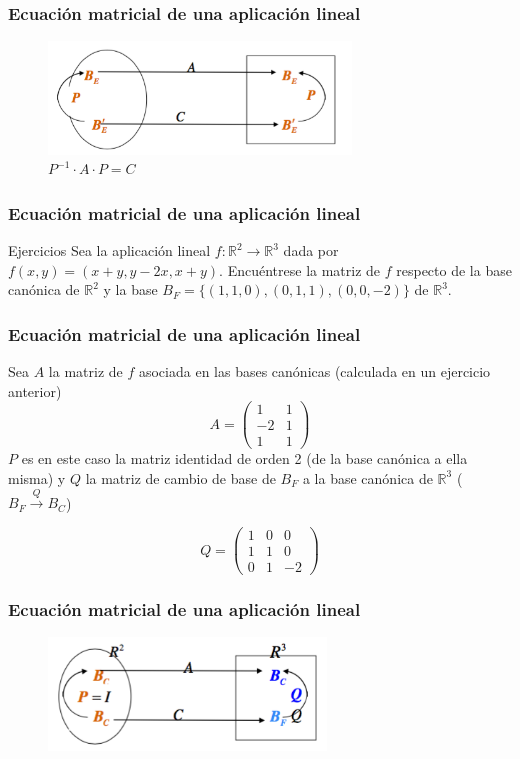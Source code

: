 \documentclass{beamer}
\begin{document}
 \begin{frame}
\frametitle{Ecuaci\'on matricial de una aplicaci\'on lineal}
\begin{figure}[h]
\label{fig:matriz de cambio}
\caption{$P^{-1}\cdot A \cdot P = C$}
\centering
\includegraphics[height=3cm]{canvi_2}
\end{figure}
 \end{frame}   
 
 
          \begin{frame}
  \frametitle{Ecuaci\'on matricial de una aplicaci\'on lineal}
\begin{block}{Ejercicios}
Sea la aplicaci\'on lineal $f:\mathbb R^2 \longrightarrow \mathbb R^3$ dada por $f(x,y)= (x+y, y-2x, x+y)$. Encu\'entrese la matriz de $f$ respecto de la base can\'onica de $\mathbb R^2$ y la base $B_F = \{(1,1,0),(0,1,1),(0,0,-2)\}$ de $\mathbb R^3$.
\end{block}
 \end{frame}    
 
 
           \begin{frame}
  \frametitle{Ecuaci\'on matricial de una aplicaci\'on lineal}
Sea $A$ la matriz de $f$ asociada en las bases can\'onicas (calculada en un ejercicio anterior)
\[ A= \left(\begin{array}{rr}1 & 1 \\-2 & 1 \\1 & 1\end{array}\right)\]
$P$ es en este caso la matriz identidad de orden 2 (de la base can\'onica a ella misma) y $Q$ la matriz de cambio de base de $B_F$ a la base can\'onica de $\mathbb R^3$ ($B_F\xrightarrow{Q} B_C$)

\[ Q= \left(\begin{array}{rrr}1 & 0& 0 \\1 & 1 & 0 \\0 & 1 & -2\end{array}\right)\]
 \end{frame}    


           \begin{frame}
  \frametitle{Ecuaci\'on matricial de una aplicaci\'on lineal}

\begin{figure}[h]
\label{fig:last_ex}
\centering
\includegraphics[height=3cm]{canvi_3}
\end{figure}

 \end{frame}    
 
\end{document}
